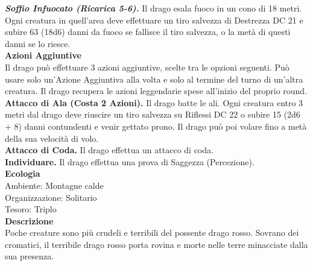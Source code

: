 \begin{multicols}{2}
\emph{\textbf{Soffio Infuocato (Ricarica 5-6).}} Il drago esala fuoco in  un cono di 18 metri. Ogni creatura in quell'area deve effettuare un tiro salvezza di Destrezza DC 21 e subire 63 (18d6) danni da fuoco se fallisce il tiro salvezza, o la metà di questi danni se lo riesce.\\
\textbf{Azioni Aggiuntive}\\
Il drago può effettuare 3 azioni aggiuntive, scelte tra le opzioni seguenti. Può usare solo un'Azione Aggiuntiva alla volta e solo al termine del turno di un'altra creatura. Il drago recupera le azioni leggendarie spese all'inizio del proprio round.\\
\textbf{Attacco di Ala (Costa 2 Azioni).} Il drago batte le ali. Ogni creatura entro 3 metri dal drago deve riuscire un tiro salvezza su Riflessi DC 22 o subire 15 (2d6 + 8) danni contundenti e venir gettato prono. Il drago può poi volare fino a metà della sua velocità di volo.\\
\textbf{Attacco di Coda.} Il drago effettua un attacco di coda.\\
\textbf{Individuare.} Il drago effettua una prova di Saggezza (Percezione).\\
\textbf{Ecologia}\\
Ambiente: Montagne calde\\
Organizzazione: Solitario\\
Tesoro: Triplo\\
\textbf{Descrizione}\\
Poche creature sono più crudeli e terribili del possente drago rosso. Sovrano dei cromatici, il terribile drago rosso porta rovina e morte nelle terre minacciate dalla sua presenza.\\


\end{multicols}
